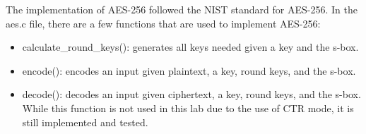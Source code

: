 The implementation of AES-256 followed the NIST standard for AES-256. 
In the aes.c file, there are a few functions that are used to implement AES-256:
\begin{itemize}
    \item calculate\_round\_keys(): generates all keys needed given a key and the s-box.
    \item encode(): encodes an input given plaintext, a key, round keys, and the s-box.
    \item decode(): decodes an input given ciphertext, a key, round keys, and the s-box. While this function is not used in this lab due to the use of CTR mode, it is still implemented and tested.
\end{itemize}